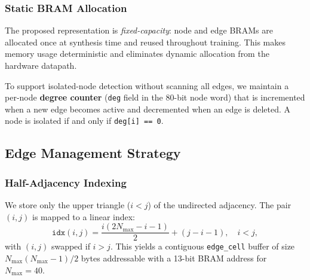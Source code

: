 \documentclass[conference]{IEEEtran}
\begin{document}
\subsubsection{Static BRAM Allocation}
The proposed representation is \emph{fixed-capacity}: node and edge BRAMs are allocated once at synthesis time and reused throughout training. This makes memory usage deterministic and eliminates dynamic allocation from the hardware datapath.

To support isolated-node detection without scanning all edges, we maintain a per-node \textbf{degree counter} (\texttt{deg} field in the 80-bit node word) that is incremented when a new edge becomes active and decremented when an edge is deleted. A node is isolated if and only if \texttt{deg[i] == 0}.

\subsection{Edge Management Strategy}
\label{sec:edge_mgmt}

\subsubsection{Half-Adjacency Indexing}
We store only the upper triangle ($i<j$) of the undirected adjacency. The pair $(i,j)$ is mapped to a linear index:
\[
\texttt{idx}(i,j) = \frac{i(2N_{\max}-i-1)}{2} + (j-i-1),\quad i<j,
\]
with $(i,j)$ swapped if $i>j$. This yields a contiguous \texttt{edge\_cell} buffer of size $N_{\max}(N_{\max}-1)/2$ bytes addressable with a 13-bit BRAM address for $N_{\max}=40$.
\end{document}
